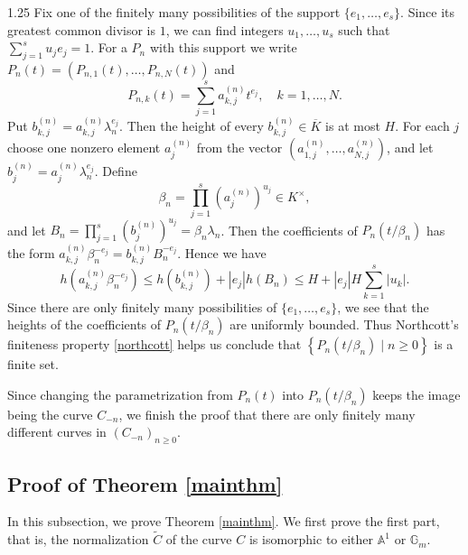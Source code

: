 \documentclass[12pt]{article}
\begin{document}
\begin{spacing}{1.25}
Fix one of the finitely many possibilities of the support $\{e_1,\dots,e_s\}$. Since its greatest common divisor is $1$, we can find integers $u_1,\dots,u_s$ such that $\sum\limits_{j=1}^{s}u_je_j=1$. For a $P_n$ with this support we write $P_n(t)=(P_{n,1}(t),\dots,P_{n,N}(t))$ and
$$
P_{n,k}(t)=\sum\limits_{j=1}^{s}a_{k,j}^{(n)}t^{e_j},\quad k=1,\dots,N.
$$
Put $b_{k,j}^{(n)}=a_{k,j}^{(n)}\lambda_n^{e_j}$. Then the height of every $b_{k,j}^{(n)}\in\overline{K}$ is at most $H$. For each $j$ choose one nonzero element $a_j^{(n)}$ from the vector $(a_{1,j}^{(n)},\dots,a_{N,j}^{(n)})$, and let $b_j^{(n)}=a_j^{(n)}\lambda_n^{e_j}$. Define
$$
\beta_n=\prod\limits_{j=1}^{s}(a_{j}^{(n)})^{u_j}\in K^{\times},
$$
and let $B_n=\prod\limits_{j=1}^{s}(b_{j}^{(n)})^{u_j}=\beta_n\lambda_n$. Then the coefficients of $P_n(t/\beta_n)$ has the form $a_{k,j}^{(n)}\beta_n^{-e_j}=b_{k,j}^{(n)}B_n^{-e_j}$. Hence we have
$$
h(a_{k,j}^{(n)}\beta_n^{-e_j})\leq h(b_{k,j}^{(n)})+|e_j|h(B_n)\leq H+|e_j|H\sum\limits_{k=1}^{s}|u_k|.
$$
Since there are only finitely many possibilities of $\{e_1,\dots,e_s\}$, we see that the heights of the coefficients of $P_n(t/\beta_n)$ are uniformly bounded. Thus Northcott's finiteness property \ref{northcott} helps us conclude that $\left\{P_n(t/\beta_n)\mid n\geq0\right\}$ is a finite set.

Since changing the parametrization from $P_n(t)$ into $P_n(t/\beta_n)$ keeps the image being the curve $C_{-n}$, we finish the proof that there are only finitely many different curves in $(C_{-n})_{n\geq0}$.
\endproof















\subsection{Proof of Theorem \ref{mainthm}}\label{sec3.2}

In this subsection, we prove Theorem \ref{mainthm}. We first prove the first part, that is, the normalization $\widetilde{C}$ of the curve $C$ is isomorphic to either $\mathbb{A}^1$ or $\mathbb{G}_m$.


\end{spacing}
\end{document}
